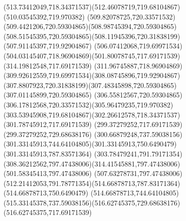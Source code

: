 {{	\curveto(513.73412049,718.34371537)(512.46078719,719.68104867)(510.03545392,719.970382)
	\curveto(509.82078725,720.33571532)(509.4421206,720.59304865)(508.98745394,720.59304865)
	\curveto(508.51545395,720.59304865)(508.11945396,720.31838199)(507.91145397,719.92904867)
	\curveto(506.07412068,719.69971534)(504.03145407,718.96904869)(501.80078745,717.69171539)
	\lineto(314.19812548,717.69171539)
	\curveto(311.96745887,718.96904869)(309.92612559,719.69971534)(308.08745896,719.92904867)
	\curveto(307.8807923,720.31838199)(307.48345898,720.59304865)(307.01145899,720.59304865)
	\curveto(306.55812567,720.59304865)(306.17812568,720.33571532)(305.96479235,719.970382)
	\curveto(303.53945908,719.68104867)(302.26612578,718.34371537)(301.78745912,717.69171539)
	\lineto(299.37279252,717.69171539)
	\lineto(299.37279252,729.68638176)
	\curveto(300.66879248,737.59038156)(301.33145913,744.64104805)(301.33145913,750.6490479)
	\lineto(301.33145913,787.83571364)
	\curveto(303.78479241,791.79171354)(308.36212562,797.47438006)(314.41545881,797.47438006)
	\lineto(501.58345413,797.47438006)
	\curveto(507.63278731,797.47438006)(512.21412053,791.78771354)(514.66878713,787.83171364)
	\lineto(514.66878713,750.6490479)
	\curveto(514.66878713,744.64104805)(515.33145378,737.59038156)(516.62745375,729.68638176)
	\lineto(516.62745375,717.69171539)
	\closepath
}
}
{
}
{
}
